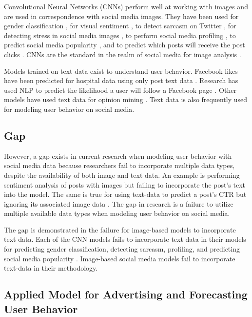 \documentclass{article}
\begin{document}
Convolutional Neural Networks (CNNs) perform well at working with images and are used in correspondence with social media images. They have been used for gender classification \cite{Hassner2015}, for visual sentiment \cite{Segalin2017, Xu2014}, to detect sarcasm on Twitter \cite{Poria2016}, for detecting stress in social media images \cite{Lin2014}, to perform social media profiling \cite{Segalin2017}, to predict social media popularity \cite{Gelli2015}, and to predict which posts will receive the post clicks \cite{Khosla2014}. CNNs are the standard in the realm of social media for image analysis \cite{Hassner2015}. 

Models trained on text data exist to understand user behavior. Facebook likes have been predicted for hospital data using only post text data \cite{8029313}. Research has used NLP to predict the likelihood a user will follow a Facebook page \cite{Ohsawa2013}. Other models have used text data for opinion mining \cite{Liu2012}. Text data is also frequently used for modeling user behavior on social media.

\subsection{Gap}

However, a gap exists in current research when modeling user behavior with social media data because researchers fail to incorporate multiple data types, despite the availability of both image and text data. An example is performing sentiment analysis of posts with images \cite{Wang2015} but failing to incorporate the post's text into the model. The same is true for using text-data to predict a post's CTR but ignoring its associated image data \cite{Li2015}. The gap in research is a failure to utilize multiple available data types when modeling user behavior on social media.

The gap is demonstrated in the failure for image-based models to incorporate text data. Each of the CNN models fails to incorporate text data in their models for predicting gender classification, detecting sarcasm, profiling, and predicting social media popularity \cite{Hassner2015, Poria2016, Segalin2017, Gelli2015}. Image-based social media models fail to incorporate text-data in their methodology.

\subsection{Applied Model for Advertising and Forecasting User Behavior}
\end{document}
